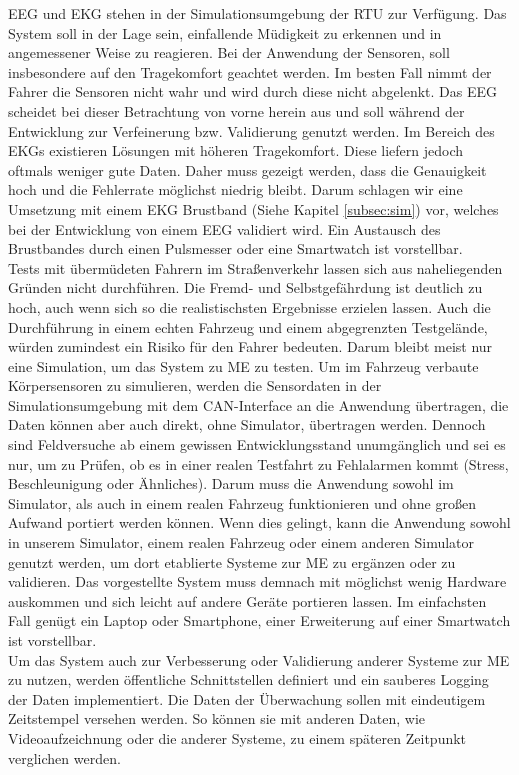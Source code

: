 {EEG und EKG stehen in der Simulationsumgebung der \acl{RTU} zur Verfügung. Das System soll in der Lage sein, einfallende Müdigkeit zu erkennen und in angemessener Weise zu reagieren. Bei der Anwendung der Sensoren, soll insbesondere auf den Tragekomfort geachtet werden. Im besten Fall nimmt der Fahrer die Sensoren nicht wahr und wird durch diese nicht abgelenkt. Das EEG scheidet bei dieser Betrachtung von vorne herein aus und soll während der Entwicklung zur Verfeinerung bzw. Validierung genutzt werden. Im Bereich des EKGs existieren Lösungen mit höheren Tragekomfort. Diese liefern jedoch oftmals weniger gute Daten. Daher muss gezeigt werden, dass die Genauigkeit hoch und die Fehlerrate möglichst niedrig bleibt. 
Darum schlagen wir eine Umsetzung mit einem EKG Brustband (Siehe Kapitel \ref{subsec:sim}) vor, welches bei der Entwicklung von einem EEG validiert wird. Ein Austausch des Brustbandes durch einen Pulsmesser oder eine Smartwatch ist vorstellbar.\\

Tests mit übermüdeten Fahrern im Straßenverkehr lassen sich aus naheliegenden Gründen nicht durchführen. Die Fremd- und Selbstgefährdung ist deutlich zu hoch, auch wenn sich so die realistischsten Ergebnisse erzielen lassen. Auch die Durchführung in einem echten Fahrzeug und einem abgegrenzten Testgelände, würden zumindest ein Risiko für den Fahrer bedeuten. Darum bleibt meist nur eine Simulation, um das System zu \acl{ME} zu testen. Um im Fahrzeug verbaute Körpersensoren zu simulieren, werden die Sensordaten in der Simulationsumgebung mit dem CAN-Interface an die Anwendung übertragen, die Daten können aber auch direkt, ohne Simulator, übertragen werden. 
Dennoch sind Feldversuche ab einem gewissen Entwicklungsstand unumgänglich und sei es nur, um zu Prüfen, ob es in einer realen Testfahrt zu Fehlalarmen kommt (Stress, Beschleunigung oder Ähnliches). Darum muss die Anwendung sowohl im Simulator, als auch in einem realen Fahrzeug funktionieren und ohne großen Aufwand portiert werden können. Wenn dies gelingt, kann die Anwendung sowohl in unserem Simulator, einem realen Fahrzeug oder einem anderen Simulator genutzt werden, um dort etablierte Systeme zur \acl{ME} zu ergänzen oder zu validieren.
Das vorgestellte System muss demnach mit möglichst wenig Hardware auskommen und sich leicht auf andere Geräte portieren lassen. Im einfachsten Fall genügt ein Laptop oder Smartphone, einer Erweiterung auf einer Smartwatch ist vorstellbar.\\

Um das System auch zur Verbesserung oder Validierung anderer Systeme zur \acl{ME} zu nutzen, werden öffentliche Schnittstellen definiert und ein sauberes Logging der Daten implementiert. Die Daten der Überwachung sollen mit eindeutigem Zeitstempel versehen werden. So können sie mit anderen Daten, wie Videoaufzeichnung oder die anderer Systeme, zu einem späteren Zeitpunkt verglichen werden. \\

}
